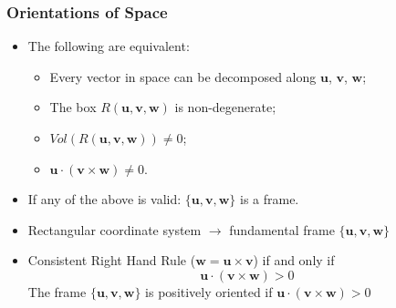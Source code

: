 \begin{frame}
  \frametitle{Orientations of Space}

\begin{itemize}
 \item The following are equivalent:
\begin{itemize}
  \item Every vector in space can be decomposed along $\textbf{u}$, $\textbf{v}$, $\textbf{w}$;
  \item The box $R(\textbf{u},\textbf{v},\textbf{w})$ is non-degenerate;
  \item $Vol(R(\textbf{u},\textbf{v},\textbf{w})) \neq 0$;
  \item $\textbf{u} \cdot (\textbf{v} \times \textbf{w}) \neq 0$.
\end{itemize}
%
\item \pause If any of the above is valid: $\{ \textbf{u}, \textbf{v}, \textbf{w}\}$ is a frame.

\item Rectangular coordinate system $\to$ fundamental frame $\{ \textbf{u}, \textbf{v}, \textbf{w}\}$

\item Consistent Right Hand Rule ($\textbf{w}=\textbf{u} \times \textbf{v}$) if and only if
%
$$\textbf{u} \cdot (\textbf{v} \times \textbf{w}) >0$$
%
The frame $\{ \textbf{u}, \textbf{v}, \textbf{w}\}$ is positively oriented if
$\textbf{u} \cdot (\textbf{v} \times \textbf{w}) >0$
%
\end{itemize}

\end{frame}
